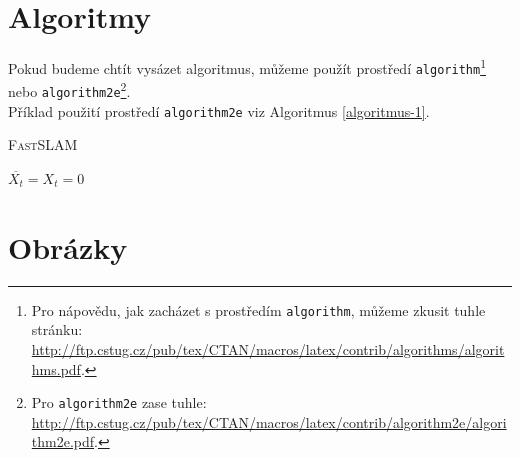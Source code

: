 \documentclass[a4paper, 11pt]{article}
\begin{document}
    \pagebreak
    
    \section{Algoritmy}
    \label{sec3}
    Pokud budeme chtít vysázet algoritmus, můžeme použít prostředí 
    \texttt{algorithm}\footnote{Pro nápovědu, jak zacházet s prostředím \texttt{algorithm}, můžeme zkusit tuhle stránku: \\
    \url{http://ftp.cstug.cz/pub/tex/CTAN/macros/latex/contrib/algorithms/algorithms.pdf}.}
    nebo \texttt{algorithm2e}\footnote{Pro \texttt{algorithm2e} zase tuhle: \url{http://ftp.cstug.cz/pub/tex/CTAN/macros/latex/contrib/algorithm2e/algorithm2e.pdf}.}. \\ 
    Příklad použití prostředí \texttt{algorithm2e} viz Algoritmus \ref{algoritmus-1}.

    \IncMargin{2em}
	\begin{algorithm}
		\caption{\textsc{FastSLAM}}
		\label{algoritmus-1}
		
		\SetNlSty{}{}{:}

		\Indm\Indmm
		\Indp\Indpp
		\BlankLine

		$ \overline{X_t} = X_t = 0 $ \\



	\end{algorithm}
	
	\section{Obrázky}
	
\end{document}
